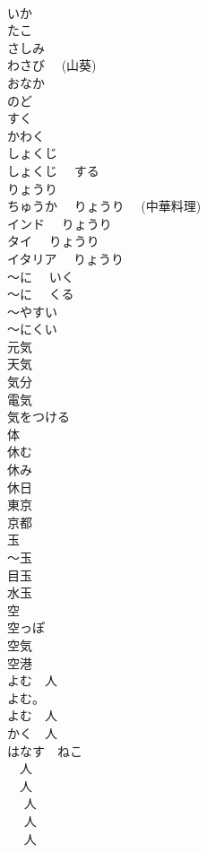 \documentclass[8pt]{extreport}
\begin{document}
\begin{CJK}{UTF8}{min}
\\	いか	
\\	たこ	
\\	さしみ	
\\	わさび　 (山葵)	
\\	おなか	
\\	のど	
\\	すく	
\\	かわく	
\\	しょくじ	
\\	しょくじ　 する	
\\	りょうり	
\\	ちゅうか　 りょうり　 (中華料理)	
\\	インド　 りょうり	
\\	タイ　 りょうり	
\\	イタリア　 りょうり	
\\	～に　 いく	
\\	～に　 くる	
\\	～やすい	
\\	～にくい	
\\	元気	
\\	天気	
\\	気分	
\\	電気	
\\	気をつける	
\\	体	
\\	休む	
\\	休み	
\\	休日	
\\	東京	
\\	京都	
\\	玉	
\\	～玉	
\\	目玉	
\\	水玉	
\\	空	
\\	空っぽ	
\\	空気	
\\	空港	
\\	よむ　人	
\\	よむ。	
\\	よむ　人	
\\	かく　人	
\\	はなす　ねこ	
\\	[しんぶんを　よむ]　人	
\\	[しんぶんを　よんだ]　人	
\\	[しんぶんを　よんでいる]　 人	
\\	[しんぶんを　よまない]　 人	
\\	[しんぶんを　よまなかった]　 人	

\end{CJK}
\end{document}
